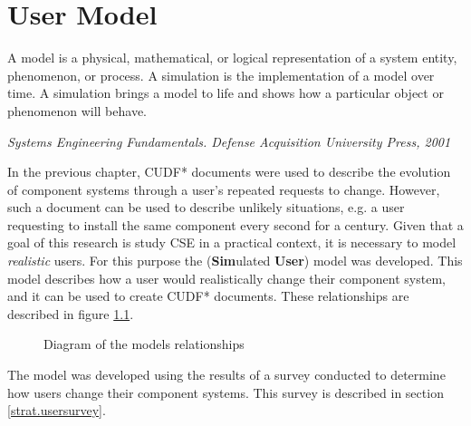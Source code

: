 \chapter{User Model}
\label{simulation}
\epigraph{A model is a physical, mathematical, or logical representation of a system entity, phenomenon, or process. 
A simulation is the implementation of a model over time. 
A simulation brings a model to life and shows how a particular object or phenomenon will behave.}
{\textit{Systems Engineering Fundamentals. Defense Acquisition University Press, 2001}}

In the previous chapter, CUDF* documents were used to describe the evolution of component systems through a user's repeated requests to change.
However, such a document can be used to describe unlikely situations,
e.g. a user requesting to install the same component every second for a century.
Given that a goal of this research is study CSE in a practical context,
it is necessary to model \textit{realistic} users. 
For this purpose the \usermodel (\textbf{Sim}ulated \textbf{User}) model was developed.
This model describes how a user would realistically change their component system,
and it can be used to create CUDF* documents.
These relationships are described in figure \ref{sim.modeldiagram}.

\begin{figure}[htp]
\begin{center}
  \caption{Diagram of the \usermodel models relationships}
  \label{sim.modeldiagram}
\end{center}
\end{figure}

The \usermodel model was developed using the results of a survey conducted to determine how users change their component systems.
This survey is described in section \ref{strat.usersurvey}.

